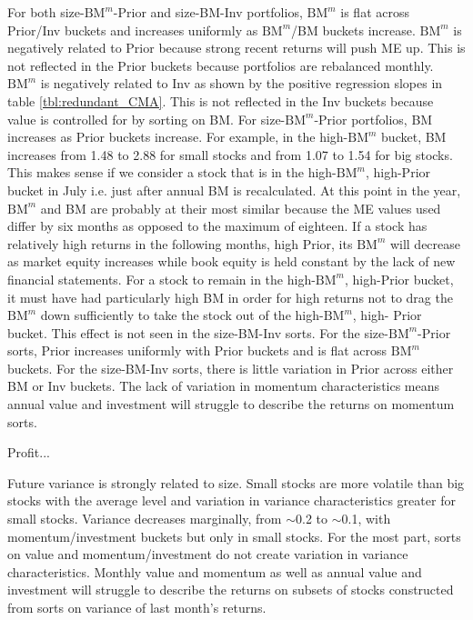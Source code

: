 For both size-$\text{BM}^m$-Prior and size-BM-Inv portfolios, $\text{BM}^m$ is
flat across Prior/Inv buckets and increases uniformly as $\text{BM}^m$/BM
buckets increase. $\text{BM}^m$ is negatively related to Prior because strong
recent returns will push ME up. This is not reflected in the Prior buckets
because portfolios are rebalanced monthly. $\text{BM}^m$ is negatively related
to Inv as shown by the positive regression slopes in table
\ref{tbl:redundant_CMA}. This is not reflected in the Inv buckets because value
is controlled for by sorting on BM. For size-$\text{BM}^m$-Prior portfolios, BM
increases as Prior buckets increase. For example, in the high-$\text{BM}^m$
bucket, BM increases from 1.48 to 2.88 for small stocks and from 1.07 to 1.54
for big stocks. This makes sense if we consider a stock that is in the
high-$\text{BM}^m$, high-Prior bucket in July i.e. just after annual BM is
recalculated. At this point in the year, $\text{BM}^m$ and BM are probably at
their most similar because the ME values
used differ by six months as opposed to the
maximum of eighteen. If a stock has relatively high returns in the following
months, high Prior, its $\text{BM}^m$ will decrease as market equity increases
while book equity is held constant by the lack of new financial statements. For
a stock to remain in the high-$\text{BM}^m$, high-Prior bucket, it must have
had particularly high BM in order for high returns not to drag the
$\text{BM}^m$ down sufficiently to take the stock out of the
high-$\text{BM}^m$, high- Prior bucket. This effect is not seen in the
size-BM-Inv sorts.
For the size-$\text{BM}^m$-Prior sorts, Prior increases uniformly
with Prior buckets and is flat across $\text{BM}^m$ buckets.
For the size-BM-Inv sorts, there is little variation in Prior across either
BM or Inv buckets.
The lack of variation in momentum characteristics means annual value and
investment will struggle to describe the returns on momentum
sorts.

Profit...

Future variance is strongly related to size. Small stocks are more volatile
than big stocks with the average level and variation in variance
characteristics greater for small stocks. Variance decreases marginally, from
$\sim$0.2 to $\sim$0.1, with momentum/investment buckets but only in small
stocks. For the most part, sorts on value and momentum/investment do not create
variation in variance characteristics. Monthly value and momentum as well as
annual value and investment will struggle to describe the returns on subsets of
stocks constructed from sorts on variance of last month's returns.

